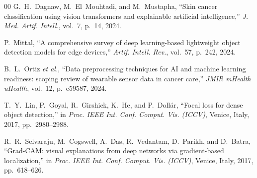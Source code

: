 \documentclass[conference]{IEEEtran}
\begin{document}
\begin{thebibliography}{00}
 G.~H.~Dagnaw, M.~El~Mouhtadi, and M.~Mustapha, ``Skin cancer classification using vision transformers and explainable artificial intelligence,'' \textit{J. Med. Artif. Intell.}, vol.~7, p.~14, 2024.
 
 P.~Mittal, ``A comprehensive survey of deep learning-based lightweight object detection models for edge devices,'' \textit{Artif. Intell. Rev.}, vol.~57, p.~242, 2024.
 
 B.~L.~Ortiz \textit{et al.}, ``Data preprocessing techniques for AI and machine learning readiness: scoping review of wearable sensor data in cancer care,'' \textit{JMIR mHealth uHealth}, vol.~12, p.~e59587, 2024.
 
 T.~Y.~Lin, P.~Goyal, R.~Girshick, K.~He, and P.~Doll\'{a}r, ``Focal loss for dense object detection,'' in \textit{Proc. IEEE Int. Conf. Comput. Vis. (ICCV)}, Venice, Italy, 2017, pp.~2980--2988.
 
 R.~R.~Selvaraju, M.~Cogswell, A.~Das, R.~Vedantam, D.~Parikh, and D.~Batra, ``Grad-CAM: visual explanations from deep networks via gradient-based localization,'' in \textit{Proc. IEEE Int. Conf. Comput. Vis. (ICCV)}, Venice, Italy, 2017, pp.~618--626.
 
\end{thebibliography}
\end{document}
